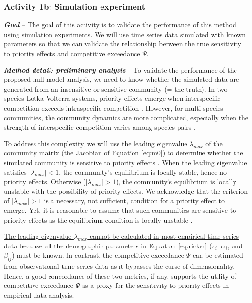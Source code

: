 \documentclass[12pt, class=article, crop=false]{standalone}
\begin{document}
\subsubsection*{Activity 1b: Simulation experiment}

\textbf{\textit{Goal}} -- 
The goal of this activity is to validate the performance of this method using simulation experiments.
We will use time series data simulated with known parameters so that we can validate the relationship between the true sensitivity to priority effects and competitive exceedance $\Psi$.

\textbf{\textit{Method detail: preliminary analysis}} -- 
To validate the performance of the proposed null model analysis, we need to know whether the simulated data are generated from an insensitive or sensitive community (= the truth).
In two species Lotka-Volterra systems, priority effects emerge when interspecific competition exceeds intraspecific competition \citep{ke_coexistence_2018}.
However, for multi-species communities, the community dynamics are more complicated, especially when the strength of interspecific competition varies among species pairs \citep{carroll_niche_2011, barabas_chessons_2018}.

To address this complexity, we will use the leading eigenvalue $\lambda_{max}$ of the community matrix (the Jacobian of Equation \ref{eq:m0}) to determine whether the simulated community is sensitive to priority effects \citep{otto_biologists_2011}.
When the leading eigenvalue satisfies $|\lambda_{max}| < 1$, the community's equilibrium is locally stable, hence no priority effects.
Otherwise ($|\lambda_{max}| > 1$), the community's equilibrium is locally unstable with the possibility of priority effects.
We acknowledge that the criterion of $|\lambda_{max}| > 1$ is a necessary, not sufficient, condition for a priority effect to emerge.
Yet, it is reasonable to assume that such communities are sensitive to priority effects as the equilibrium condition is locally unstable  \citep{otto_biologists_2011}. 

\ul{The leading eigenvalue $\lambda_{max}$ cannot be calculated in most empirical time-series data} because all the demographic parameters in Equation \ref{eq:ricker} ($r_i$, $\alpha_i$, and $\beta_{ij}$) must be known.
In contrast, the competitive exceedance $\Psi$ can be estimated from observational time-series data as it bypasses the curse of dimensionality.
Hence, a good concordance of these two metrics, if any, supports the utility of competitive exceedance $\Psi$ as a proxy for the sensitivity to priority effects in empirical data analysis.
\end{document}
